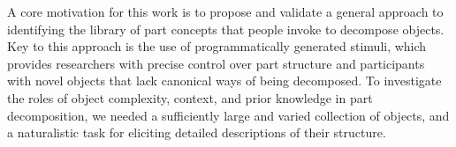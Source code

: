 \documentclass[10pt,letterpaper]{article}
\begin{document}




A core motivation for this work is to propose and validate a general approach to identifying the library of part concepts that people invoke to decompose objects. 
Key to this approach is the use of programmatically generated stimuli, which provides researchers with precise control over part structure and participants with novel objects that lack canonical ways of being decomposed.
To investigate the roles of object complexity, context, and prior knowledge in part decomposition, we needed a sufficiently large and varied collection of objects, and a naturalistic task for eliciting detailed descriptions of their structure. 

\end{document}
